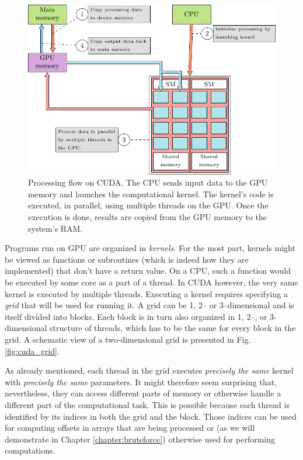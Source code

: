 \begin{figure}[ht]
  \centering
  \includegraphics[width=\textwidth]{figures/cuda_workflow}
  \caption{Processing flow on CUDA. The CPU sends input data to the GPU memory and
    launches the computational kernel. The kernel's code is executed, in parallel,
    using multiple threads on the GPU. Once the execution is done, results are
    copied from the GPU memory to the system's RAM.} \label{fig:cuda_flow}
\end{figure}

Programs run on GPU are organized in \emph{kernels}. For the most part, kernels
might be viewed as functions or subroutines (which is indeed how they are
implemented) that don't have a return value. On a CPU, such a function would be
executed by some core as a part of a thread. In CUDA however, the very same
kernel is executed by multiple threads. Executing a kernel requires specifying
a \emph{grid} that will be used for running it. A grid can be 1, 2-- or
3--dimensional and is itself divided into blocks. Each block is in turn also
organized in 1, 2--, or 3-dimensional structure of threads, which has to be the same for every
block in the grid. A schematic view of a two-dimensional grid is presented in
Fig. \ref{fig:cuda_grid}.

As already mentioned, each thread in the grid executes \emph{precisely the
  same} kernel with \emph{precisely the same} parameters. It might therefore seem
surprising that, nevertheless, they can access different parts of memory or
otherwise handle a different part of the computational task. This is possible
because each thread is identified by its indices in both the grid and the
block. Those indices can be used for computing offsets in arrays that are
being processed or (as we will demonstrate in Chapter \ref{chapter:bruteforce})
otherwise used for performing computations.

